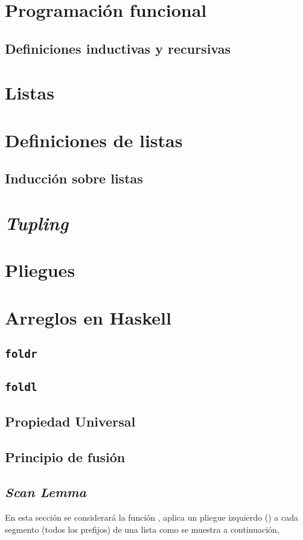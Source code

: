 \section{Programación funcional}
\subsection{Definiciones inductivas y recursivas}

\section{Listas}
\section{Definiciones de listas}
\subsection{Inducción sobre listas}
\section{\textit{Tupling}}

\section{Pliegues}

\section{Arreglos en Haskell}
\label{fundamentos:arreglos}
\subsection{\texttt{foldr}}
\subsection{\texttt{foldl}}
\subsection{Propiedad Universal}
\label{fundamentos:prop_universal}
\subsection{Principio de fusión}
\subsection{\textit{Scan Lemma}}\label{fundamentos:scan_lemma}
En esta sección se considerará la función ,  aplica un pliegue
izquierdo () a cada segmento (todos los prefijos) de una lista como se muestra
a continuación,

